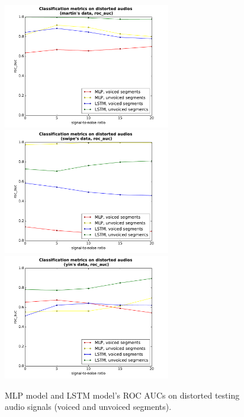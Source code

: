 \documentclass[11pt,a4paper]{report}
\begin{document}
\begin{figure}[htbp]
  \centering
  \includegraphics[width=0.65\textwidth]{classification_metrics_voicedness_martin_roc_auc.pdf}
  \includegraphics[width=0.65\textwidth]{classification_metrics_voicedness_swipe_roc_auc.pdf}
  \includegraphics[width=0.65\textwidth]{classification_metrics_voicedness_yin_roc_auc.pdf}
  \caption{MLP model and LSTM model's ROC AUCs on distorted testing audio signals (voiced and unvoiced segments).}
  \label{fig:distorted-testing-data-roc-auc-voicedness}
\end{figure}
\end{document}
